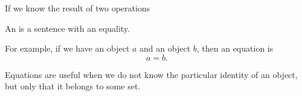 
\sbasic


\sstart
{}


If we know the result of two operations


An  is a sentence
with an equality.

For example, if we have an object $a$
and an object $b$, then an equation
is
\[
  a = b.
\]

Equations are useful when we do not
know the particular identity of an
object, but only that it belongs to
some set.
\strats
